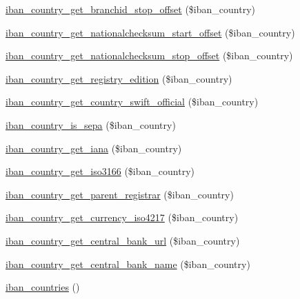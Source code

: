 \begin{DoxyCompactItemize}
\item 
\hyperlink{classWEPPO_1_1Helpers_1_1IBAN_aef935a504493e4f9d210904a68bc6c31}{iban\+\_\+country\+\_\+get\+\_\+branchid\+\_\+stop\+\_\+offset} (\$iban\+\_\+country)
\item 
\hyperlink{classWEPPO_1_1Helpers_1_1IBAN_a281ec500d37caa131042f29375192bd1}{iban\+\_\+country\+\_\+get\+\_\+nationalchecksum\+\_\+start\+\_\+offset} (\$iban\+\_\+country)
\item 
\hyperlink{classWEPPO_1_1Helpers_1_1IBAN_ac99a10ffae6fb05468a3673cc9c2b5a0}{iban\+\_\+country\+\_\+get\+\_\+nationalchecksum\+\_\+stop\+\_\+offset} (\$iban\+\_\+country)
\item 
\hyperlink{classWEPPO_1_1Helpers_1_1IBAN_a340ec06efeb37e5b47aa50edbe5bc4d8}{iban\+\_\+country\+\_\+get\+\_\+registry\+\_\+edition} (\$iban\+\_\+country)
\item 
\hyperlink{classWEPPO_1_1Helpers_1_1IBAN_a5ca1103949bf2744b26712639d18538c}{iban\+\_\+country\+\_\+get\+\_\+country\+\_\+swift\+\_\+official} (\$iban\+\_\+country)
\item 
\hyperlink{classWEPPO_1_1Helpers_1_1IBAN_a3d12594769819d999127d4e1c35d8c83}{iban\+\_\+country\+\_\+is\+\_\+sepa} (\$iban\+\_\+country)
\item 
\hyperlink{classWEPPO_1_1Helpers_1_1IBAN_a338893b209cfce5cccf6336da5b95a3f}{iban\+\_\+country\+\_\+get\+\_\+iana} (\$iban\+\_\+country)
\item 
\hyperlink{classWEPPO_1_1Helpers_1_1IBAN_ae1e2d3af7aa49acf5c262412917e5520}{iban\+\_\+country\+\_\+get\+\_\+iso3166} (\$iban\+\_\+country)
\item 
\hyperlink{classWEPPO_1_1Helpers_1_1IBAN_a3c57e143554ae1ad559d2f580425be61}{iban\+\_\+country\+\_\+get\+\_\+parent\+\_\+registrar} (\$iban\+\_\+country)
\item 
\hyperlink{classWEPPO_1_1Helpers_1_1IBAN_aadf383331702117ec4ce9ea7b5b5e6a7}{iban\+\_\+country\+\_\+get\+\_\+currency\+\_\+iso4217} (\$iban\+\_\+country)
\item 
\hyperlink{classWEPPO_1_1Helpers_1_1IBAN_a3d14e6439812cab3ad16a40798124baa}{iban\+\_\+country\+\_\+get\+\_\+central\+\_\+bank\+\_\+url} (\$iban\+\_\+country)
\item 
\hyperlink{classWEPPO_1_1Helpers_1_1IBAN_aa1d247c1b8e72dd1eb6ec7c3e4390b38}{iban\+\_\+country\+\_\+get\+\_\+central\+\_\+bank\+\_\+name} (\$iban\+\_\+country)
\item 
\hyperlink{classWEPPO_1_1Helpers_1_1IBAN_a3ba55a45e447c4219b9370c51f9f94cb}{iban\+\_\+countries} ()
\item 

\end{DoxyCompactItemize}
